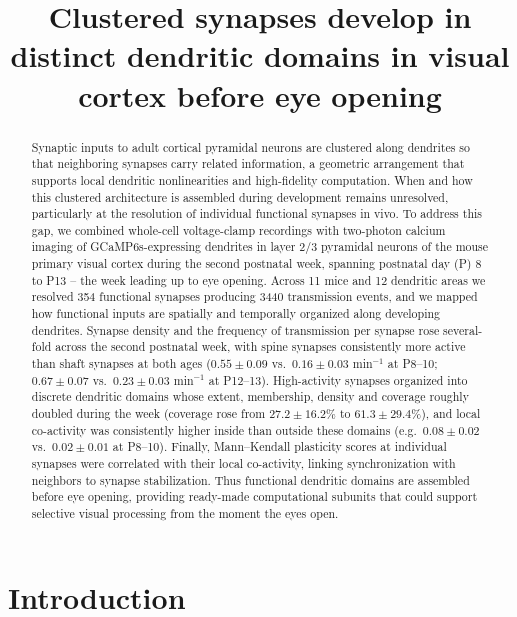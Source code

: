 \documentclass[11pt]{article}
\title{Clustered synapses develop in distinct dendritic domains in visual cortex before eye opening}
\author{}
\date{}
\begin{document}
\maketitle

\begin{abstract}
\noindent Synaptic inputs to adult cortical pyramidal neurons are clustered along dendrites so that neighboring synapses carry related information, a geometric arrangement that supports local dendritic nonlinearities and high-fidelity computation. When and how this clustered architecture is assembled during development remains unresolved, particularly at the resolution of individual functional synapses in vivo. To address this gap, we combined whole-cell voltage-clamp recordings with two-photon calcium imaging of GCaMP6s-expressing dendrites in layer 2/3 pyramidal neurons of the mouse primary visual cortex during the second postnatal week, spanning postnatal day (P) 8 to P13 -- the week leading up to eye opening. Across 11 mice and 12 dendritic areas we resolved 354 functional synapses producing 3440 transmission events, and we mapped how functional inputs are spatially and temporally organized along developing dendrites. Synapse density and the frequency of transmission per synapse rose several-fold across the second postnatal week, with spine synapses consistently more active than shaft synapses at both ages ($0.55 \pm 0.09$ vs.\ $0.16 \pm 0.03$ min$^{-1}$ at P8--10; $0.67 \pm 0.07$ vs.\ $0.23 \pm 0.03$ min$^{-1}$ at P12--13). High-activity synapses organized into discrete dendritic domains whose extent, membership, density and coverage roughly doubled during the week (coverage rose from $27.2 \pm 16.2\%$ to $61.3 \pm 29.4\%$), and local co-activity was consistently higher inside than outside these domains (e.g.\ $0.08 \pm 0.02$ vs.\ $0.02 \pm 0.01$ at P8--10). Finally, Mann--Kendall plasticity scores at individual synapses were correlated with their local co-activity, linking synchronization with neighbors to synapse stabilization. Thus functional dendritic domains are assembled before eye opening, providing ready-made computational subunits that could support selective visual processing from the moment the eyes open.
\end{abstract}

\section{Introduction}
\end{document}

